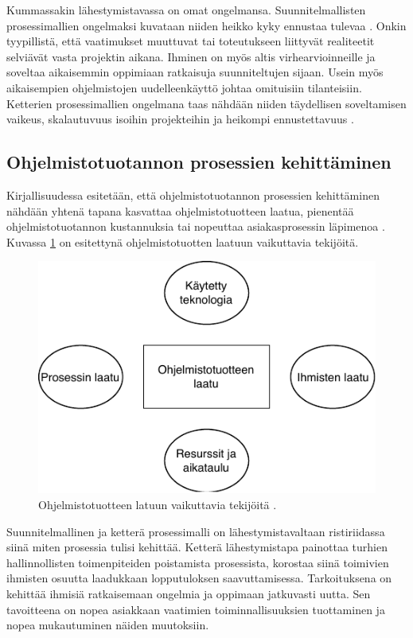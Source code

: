 \documentclass[finnish,12pt,a4paper,pdftex]{article}
\begin{document}
Kummassakin lähestymistavassa on omat ongelmansa. Suunnitelmallisten prosessimallien ongelmaksi kuvataan niiden heikko kyky ennustaa tulevaa \citep{ohjelmistotuotanto}. Onkin tyypillistä, että vaatimukset muuttuvat tai toteutukseen liittyvät realiteetit selviävät vasta projektin aikana. Ihminen on myös altis virhearvioinneille ja soveltaa aikaisemmin oppimiaan ratkaisuja suunniteltujen sijaan. Usein myös aikaisempien ohjelmistojen uudelleenkäyttö johtaa omituisiin tilanteisiin. Ketterien prosessimallien ongelmana taas nähdään niiden täydellisen soveltamisen vaikeus, skalautuvuus isoihin projekteihin ja heikompi ennustettavuus \citep{okaytannot}.\\

\subsection{Ohjelmistotuotannon prosessien kehittäminen}

Kirjallisuudessa esitetään, että ohjelmistotuotannon prosessien kehittäminen nähdään yhtenä tapana kasvattaa ohjelmistotuotteen laatua, pienentää ohjelmistotuotannon kustannuksia tai nopeuttaa asiakasprosessin läpimenoa \citep{sommerville}. Kuvassa \ref{fig:ohjlaatu} on esitettynä ohjelmistotuotten laatuun vaikuttavia tekijöitä. \\

\begin{figure}[!h]
    \centering
    \includegraphics[scale=0.8]{images/ohjelmistonlaatu.pdf}
    \caption{Ohjelmistotuotteen latuun vaikuttavia tekijöitä \citep{sommerville}.}
    \label{fig:ohjlaatu}
\end{figure}

Suunnitelmallinen ja ketterä prosessimalli on lähestymistavaltaan ristiriidassa siinä miten prosessia tulisi kehittää. Ketterä lähestymistapa painottaa turhien hallinnollisten toimenpiteiden poistamista prosessista, korostaa siinä toimivien ihmisten osuutta laadukkaan lopputuloksen saavuttamisessa. Tarkoituksena on kehittää ihmisiä ratkaisemaan ongelmia ja oppimaan jatkuvasti uutta. Sen tavoitteena on nopea asiakkaan vaatimien toiminnallisuuksien tuottaminen ja nopea mukautuminen näiden muutoksiin.\citep{sommerville}\\
\end{document}
